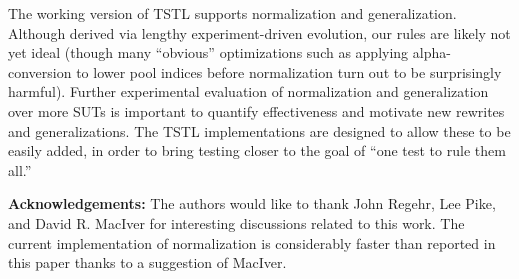The working version of  TSTL \cite{tstl} supports
normalization and generalization.  Although derived via lengthy experiment-driven
evolution, our rules are likely not yet ideal (though many ``obvious''
optimizations such as applying alpha-conversion to lower pool indices
before normalization turn out to be surprisingly harmful).   Further experimental
evaluation of normalization and generalization over more SUTs is
important to quantify effectiveness and motivate new rewrites and
generalizations.  The TSTL implementations are designed to allow these
to be easily added, in order to bring testing closer to the
goal of ``one test to rule them all.''


{\scriptsize {\bf Acknowledgements:} The authors would like to thank
  John Regehr, Lee Pike, and David R. MacIver for interesting
  discussions related to this work.  The current implementation of
  normalization is considerably faster than reported in
  this paper thanks to a suggestion of MacIver.
}